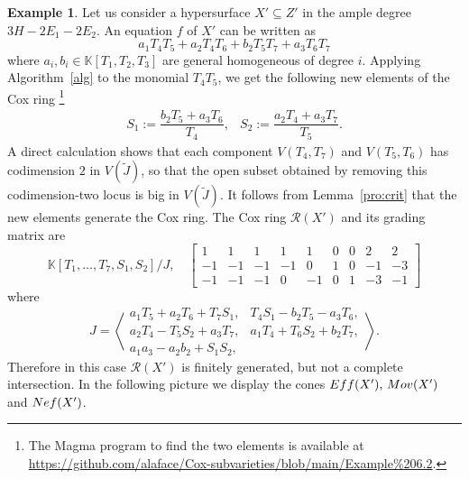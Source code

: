 \documentclass{amsart}
\theoremstyle{definition}
\newtheorem{example}[theorem]{Example}
\theoremstyle{remark}
\begin{document}
\begin{example}
Let us consider a hypersurface
$X'\subseteq Z'$ in the ample degree
$3H-2E_1-2E_2$. An equation $f$
of $X'$ can be written as
\[
 a_1T_4T_5 +a_2T_4T_6+b_2T_5T_7+a_3T_6T_7
\]
where $a_i,b_i\in\mathbb K[T_1,T_2,T_3]$
are general homogeneous of degree $i$.
Applying Algorithm~\ref{alg} to the monomial
$T_4T_5$, we get
the following new elements of the Cox ring
\footnote{The Magma program to find the two elements is available at \url{https://github.com/alaface/Cox-subvarieties/blob/main/Example\%206.2}.}
\[
\begin{array}{ll}
 S_1 :=  \dfrac{b_2T_5 + a_3T_6}{T_4},
 &
 S_2 :=  \dfrac{a_2T_4 + a_3T_7}{T_5}.
 \end{array}
\]
A direct calculation shows that each component
$V(T_4,T_7)$ and $V(T_5,T_6)$
has codimension $2$ in $V(\tilde J)$, so that
the open subset obtained by removing this codimension-two locus is big in $V(\tilde J)$.
It follows from Lemma~\ref{pro:crit} that
the new elements generate the Cox ring.
The Cox ring $\mathcal R(X')$ and
its grading matrix are
\[
\mathbb K[T_1,\dots,T_7,S_1,S_2]/J,
\quad
\left[
\begin{array}{rrrrrrrrr}
1 & 1 & 1 & 1 & 1 & 0 & 0 & 2 & 2\\
-1 &-1 &-1 &-1 & 0 & 1 & 0 &-1 &-3\\
 -1 &-1 &-1 & 0  &-1 & 0 & 1 &-3 &-1
\end{array}
\right]
\]
where
\[
    J = \left\langle
    \begin{array}{ll}
    a_1T_5 + a_2T_6 + T_7S_1, &
    T_4S_1 - b_2T_5 - a_3T_6, \\
    a_2T_4 - T_5S_2 + a_3T_7, &
    a_1T_4 + T_6S_2 + b_2T_7,\\
    a_1a_3 - a_2b_2 + S_1S_2,
    \end{array}
    \right\rangle.
\]
Therefore in this case $\mathcal R(X')$
is finitely generated, but not a complete intersection.
In the following picture we display the
cones ${\rm Eff}(X'),\,
{\rm Mov}(X')$ and ${\rm Nef}(X')$.

\begin{center}
\end{center}
\end{example}
\end{document}
